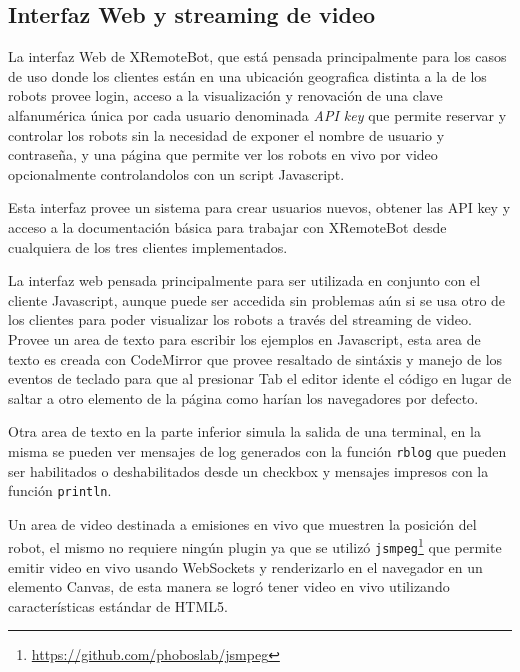 \subsection{Interfaz Web y streaming de video}

La interfaz Web de XRemoteBot, que está pensada principalmente para los casos
de uso donde los clientes están en una ubicación geografica distinta a la de
los robots provee login, acceso a la visualización y renovación de una
clave alfanumérica única por cada usuario denominada \textit{API key} que
permite reservar y controlar los robots sin la necesidad de exponer el nombre
de usuario y contraseña, y una página que permite ver los robots en vivo por
video opcionalmente controlandolos con un script Javascript.


Esta interfaz provee un sistema para crear usuarios nuevos, obtener las
API key y acceso a la documentación básica para trabajar con XRemoteBot
desde cualquiera de los tres clientes implementados.

La interfaz web pensada principalmente para ser utilizada en conjunto
 con el cliente
Javascript, aunque puede ser accedida sin problemas aún si se usa
otro de los clientes para poder visualizar los robots a través del
streaming de video. Provee un area de texto para escribir los ejemplos
en Javascript, esta area de texto es creada con CodeMirror
que provee resaltado de sintáxis y manejo de los eventos de teclado para
que al presionar Tab el editor idente el código en lugar de saltar a otro
elemento de la página como harían los navegadores por defecto.

Otra area de texto en la parte inferior
 simula la salida de una terminal, en la misma
se pueden ver mensajes de log generados con la función
\texttt{rblog} que pueden ser habilitados o deshabilitados desde un
checkbox y mensajes impresos con la función \texttt{println}.

Un area de video destinada a emisiones en vivo que muestren la posición
del robot, el mismo no requiere ningún plugin ya que se utilizó
\texttt{jsmpeg}\footnote{\url{https://github.com/phoboslab/jsmpeg}}
que permite emitir video en vivo usando WebSockets y renderizarlo
en el navegador en un elemento Canvas, de esta manera se logró tener
video en vivo utilizando características estándar de HTML5.
